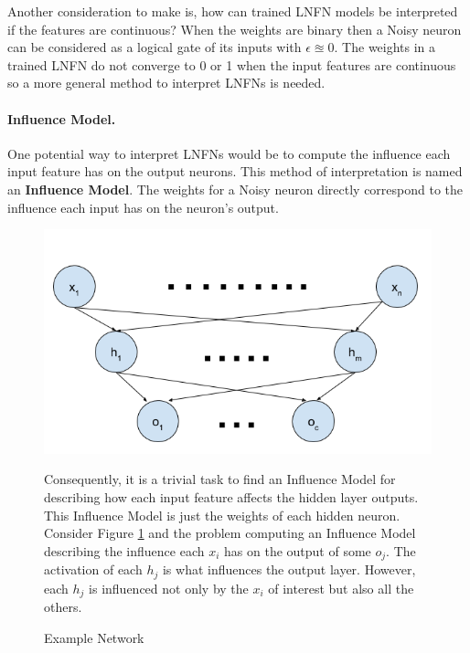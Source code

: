 Another consideration to make is, how can trained LNFN models be interpreted if the features are continuous? When the weights are binary then a Noisy neuron can be considered as a logical gate of its inputs with $\epsilon \approxeq 0$. The weights in a trained LNFN do not converge to 0 or 1 when the input features are continuous so a more general method to interpret LNFNs is needed.

\paragraph{Influence Model.}
One potential way to interpret LNFNs would be to compute the influence each input feature has on the output neurons. This method of interpretation is named an \textbf{Influence Model}.  The weights for a Noisy neuron directly correspond to the influence each input has on the neuron's output. 

\begin{figure}[H]
	\centering
	\begin{minipage}[t]{0.5\textwidth}
		\vspace{0px}
		\includegraphics[width=\textwidth]{NetworkExample.png}
		\caption{Example Network}
		\label{fig:network-example}
	\end{minipage}
	\hspace{1px}
	\begin{minipage}[t]{0.45\textwidth}
		\vspace{2px}
		Consequently, it is a trivial task to find an Influence Model for describing how each input feature affects the hidden layer outputs. This Influence Model is just the weights of each hidden neuron. Consider Figure \ref{fig:network-example}  and the problem computing an Influence Model describing the influence each $x_i$ has on the output of some $o_j$. The activation of each $h_j$ is what influences the output layer. However, each $h_j$ is influenced not only by the $x_i$ of interest but also all the others.
	\end{minipage}
	\hfill
\end{figure}

